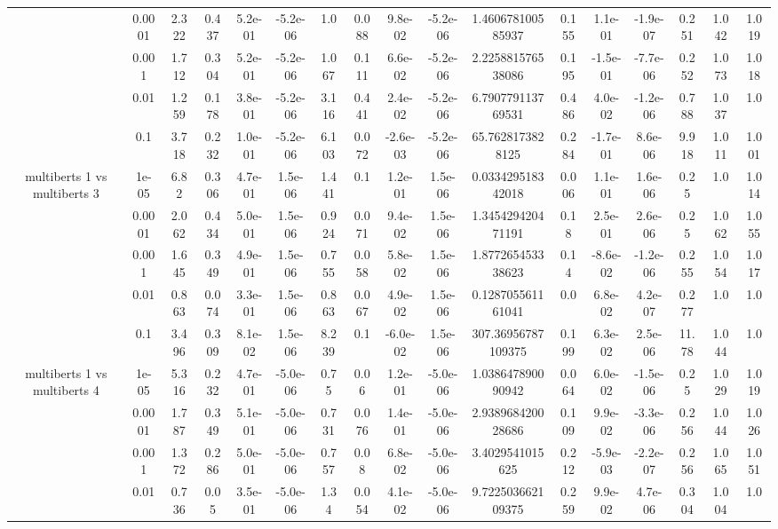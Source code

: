 \begin{tabular}{|c|c|c|c|c|c|c|c|c|c|c|c|c|c|c|c|c|}
 & 0.0001 & 2.322 & 0.437 & 5.2e-01 & -5.2e-06 & 1.0 & 0.088 & 9.8e-02 & -5.2e-06 & 1.460678100585937 & 0.155 & 1.1e-01 & -1.9e-07 & 0.251 & 1.042 & 1.019 \\
 & 0.001 & 1.712 & 0.304 & 5.2e-01 & -5.2e-06 & 1.067 & 0.111 & 6.6e-02 & -5.2e-06 & 2.225881576538086 & 0.195 & -1.5e-01 & -7.7e-06 & 0.252 & 1.073 & 1.018 \\
 & 0.01 & 1.259 & 0.178 & 3.8e-01 & -5.2e-06 & 3.116 & 0.441 & 2.4e-02 & -5.2e-06 & 6.790779113769531 & 0.486 & 4.0e-02 & -1.2e-06 & 0.788 & 1.037 & 1.0 \\
 & 0.1 & 3.718 & 0.232 & 1.0e-01 & -5.2e-06 & 6.103 & 0.072 & -2.6e-03 & -5.2e-06 & 65.7628173828125 & 0.284 & -1.7e-01 & 8.6e-06 & 9.918 & 1.011 & 1.001 \\
\hline
\multirow{5}{*}{multiberts 1 vs multiberts 3} & 1e-05 & 6.82 & 0.306 & 4.7e-01 & 1.5e-06 & 1.441 & 0.1 & 1.2e-01 & 1.5e-06 & 0.033429518342018 & 0.006 & 1.1e-01 & 1.6e-06 & 0.25 & 1.0 & 1.014 \\
 & 0.0001 & 2.062 & 0.434 & 5.0e-01 & 1.5e-06 & 0.924 & 0.071 & 9.4e-02 & 1.5e-06 & 1.345429420471191 & 0.18 & 2.5e-01 & 2.6e-06 & 0.25 & 1.062 & 1.055 \\
 & 0.001 & 1.645 & 0.349 & 4.9e-01 & 1.5e-06 & 0.755 & 0.058 & 5.8e-02 & 1.5e-06 & 1.877265453338623 & 0.14 & -8.6e-02 & -1.2e-06 & 0.255 & 1.054 & 1.017 \\
 & 0.01 & 0.863 & 0.074 & 3.3e-01 & 1.5e-06 & 0.863 & 0.067 & 4.9e-02 & 1.5e-06 & 0.128705561161041 & 0.0 & 6.8e-02 & 4.2e-07 & 0.277 & 1.0 & 1.0 \\
 & 0.1 & 3.496 & 0.309 & 8.1e-02 & 1.5e-06 & 8.239 & 0.1 & -6.0e-02 & 1.5e-06 & 307.36956787109375 & 0.199 & 6.3e-02 & 2.5e-06 & 11.78 & 1.044 & 1.0 \\
\hline
\multirow{5}{*}{multiberts 1 vs multiberts 4} & 1e-05 & 5.316 & 0.232 & 4.7e-01 & -5.0e-06 & 0.75 & 0.06 & 1.2e-01 & -5.0e-06 & 1.038647890090942 & 0.064 & 6.0e-02 & -1.5e-06 & 0.25 & 1.029 & 1.019 \\
 & 0.0001 & 1.787 & 0.349 & 5.1e-01 & -5.0e-06 & 0.731 & 0.076 & 1.4e-01 & -5.0e-06 & 2.938968420028686 & 0.109 & 9.9e-02 & -3.3e-06 & 0.256 & 1.044 & 1.026 \\
 & 0.001 & 1.372 & 0.286 & 5.0e-01 & -5.0e-06 & 0.757 & 0.08 & 6.8e-02 & -5.0e-06 & 3.4029541015625 & 0.212 & -5.9e-03 & -2.2e-07 & 0.256 & 1.065 & 1.051 \\
 & 0.01 & 0.736 & 0.05 & 3.5e-01 & -5.0e-06 & 1.34 & 0.054 & 4.1e-02 & -5.0e-06 & 9.722503662109375 & 0.259 & 9.9e-02 & 4.7e-06 & 0.304 & 1.004 & 1.0 \\

\end{tabular}
